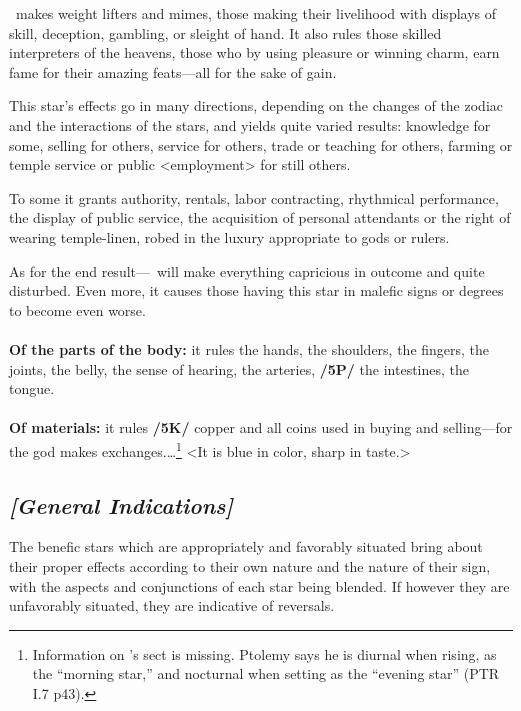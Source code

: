 \Mercury\, makes weight lifters and mimes, those making their livelihood with displays of skill, deception, gambling, or sleight of hand. It also rules those skilled interpreters of the heavens, those who by using pleasure or winning charm, earn fame for their amazing feats—all for the sake of gain. 

\mndl[0.2cm]
This star’s effects go in many directions, depending on the changes of the zodiac and the interactions of the stars, and yields quite varied results: knowledge for some, selling for others, service for others, trade or teaching for others, farming or temple service or public <employment> for still others. 

To some it grants authority, rentals, labor contracting, rhythmical performance, the display of public service, the acquisition of personal attendants or the right of wearing temple-linen, robed in the luxury appropriate to gods or rulers. 

\mndl[0.2cm]
As for the end result—\Mercury\, will make everything capricious in outcome and quite disturbed. Even more, it causes those having this star in malefic signs or degrees to become even worse. \\
\\
\textbf{Of the parts of the body:} it rules the hands, the shoulders, the fingers, the joints, the belly, the sense of hearing, the arteries, \textbf{/5P/} the intestines, the tongue. \\
\\
\textbf{Of materials:} it rules \textbf{/5K/} copper and all coins used in buying and selling—for the god makes exchanges.\ldots\footnote{Information on \Mercury's sect is missing. Ptolemy says he is diurnal when rising, as the ``morning star,'' and nocturnal when setting as the ``evening star'' (PTR I.7 p43).} <It is blue in color, sharp in taste.>

\secbr
\subsection{\textit{[General Indications]}}
\mndl[0.2cm]
The   benefic stars  which are appropriately and favorably situated bring about their proper effects according to their own nature and the nature of their sign, with the aspects and conjunctions of each star being blended. If however they are unfavorably situated, they are indicative of reversals. 


